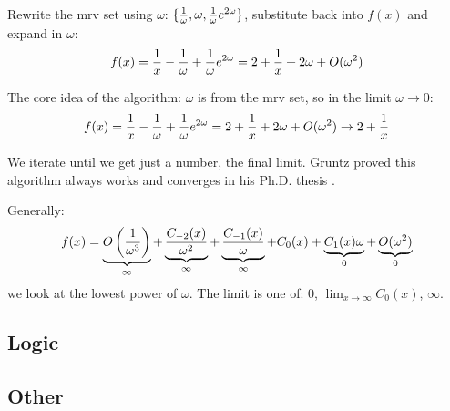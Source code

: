 Rewrite the mrv set using $\omega$: $\{{1\over\omega}, \omega,
{1\over\omega}e^{2\omega}\}$, substitute back into $f(x)$ and expand in
$\omega$:
$$f(x) = {1\over x}-{1\over\omega}+{1\over\omega}e^{2\omega}
    = 2+{1\over x} + 2\omega + O(\omega^2)$$

The core idea of the algorithm: $\omega$ is from the mrv set, so in the limit
$\omega\to0$:
$$f(x) = {1\over x}-{1\over\omega}+{1\over\omega}e^{2\omega}
    = 2+{1\over x} + 2\omega + O(\omega^2)
    \to 2 + {1\over x}$$

We iterate until we get just a number, the final limit. Gruntz proved this
algorithm always works and converges in his Ph.D. thesis
\cite{gruntz1996computing}.

Generally:
$$ f(x) = \underbrace{O\left({1\over \omega^3}\right)}_\infty
    + \underbrace{C_{-2}(x)\over \omega^2}_\infty
    + \underbrace{C_{-1}(x)\over \omega}_\infty
    + {C_{0}(x)}
    + \underbrace{C_{1}(x)\omega}_0
    + \underbrace{O(\omega^2)}_0
$$
we look at the lowest power of $\omega$. The limit is one of: $0$,
$\lim_{x\to\infty} C_0(x)$, $\infty$.

\subsection{Logic}

\subsection{Other}
